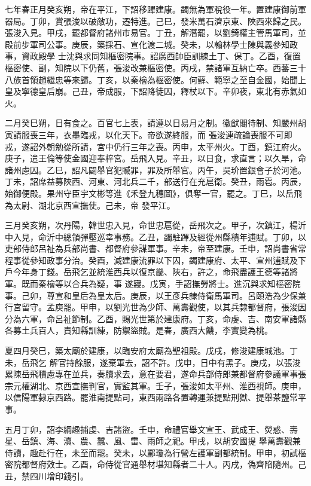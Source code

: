 \begin{pinyinscope}
 七年春正月癸亥朔，帝在平江，下詔移蹕建康。蠲無為軍稅役一年。置建康御前軍器局。丁卯，賞張浚以破敵功，遷特進。己巳，發米萬石濟京東、陜西來歸之民。張浚入見。甲戌，罷都督府諸州市易官。丁丑，解潛罷，以劉錡權主管馬軍司，並殿前步軍司公事。庚辰，築採石、宣化渡二城。癸未，以翰林學士陳與義參知政事，資政殿學
 士沈與求同知樞密院事。詔廣西帥臣訓練土丁、保丁。乙酉，復置樞密使、副，知院以下仍舊，張浚改兼樞密使。丙戌，禁諸軍互納亡卒。西蕃三十八族首領趙繼忠等來歸。丁亥，以秦檜為樞密使。何蘚、範寧之至自金國，始聞上皇及寧德皇后崩。己丑，帝成服，下詔降徒囚，釋杖以下。辛卯夜，東北有赤氣如火。



 二月癸巳朔，日有食之。百官七上表，請遵以日易月之制。徽猷閣待制、知嚴州胡寅請服喪三年，衣墨臨戎，以化天下。帝欲遂終服，而
 張浚連疏論喪服不可即戎，遂詔外朝勉從所請，宮中仍行三年之喪。丙申，太平州火。丁酉，鎮江府火。庚子，遣王倫等使金國迎奉梓宮。岳飛入見。辛丑，以日食，求直言；以久旱，命諸州慮囚。乙巳，詔凡闢舉官犯贓罪，罪及所舉官。丙午，吳玠置銀會子於河池。丁未，詔席益募陜西、河東、河北兵二千，部送行在充扈衛。癸丑，雨雹。丙辰，始御便殿。果州守臣宇文彬等進《禾登九穗圖》，俱奪一官，罷之。丁巳，以岳飛為太尉、湖北京西宣撫使。己未，帝
 發平江。



 三月癸亥朔，次丹陽，韓世忠入見，命世忠扈從，岳飛次之。甲子，次鎮江，楊沂中入見，命沂中總領彈壓巡幸事務。乙丑，蠲駐蹕及經從州縣積年逋賦。丁卯，以吏部侍郎呂祉為兵部尚書、都督府參謀軍事。辛未，帝至建康。壬申，詔尚書省常程事從參知政事分治。癸酉，減建康流罪以下囚，蠲建康府、太平、宣州逋賦及下戶今年身丁錢。岳飛乞並統淮西兵以復京畿、陜右，許之，命飛盡護王德等諸將軍。既而秦檜等以合兵為疑，事
 遂寢。戊寅，手詔撫勞將士。進沉與求知樞密院事。己卯，尊宣和皇后為皇太后。庚辰，以王彥兵隸侍衛馬軍司。呂頤浩為少保兼行宮留守。孟庾罷。甲申，以劉光世為少師、萬壽觀使，以其兵隸都督府，張浚因分為六軍，命呂祉節制。乙酉，賜光世第於建康府。丁亥，命虔、吉、南安軍諸縣各募土兵百人，責知縣訓練，防禦盜賊。是春，廣西大饑，李實變為桃。



 夏四月癸巳，築太廟於建康，以臨安府太廟為聖祖殿。戊戌，修浚建康城池。丁未，岳飛乞
 解官持餘服，遂棄軍去，詔不許。戊申，日中有黑子。庚戌，以張浚累陳岳飛積慮專在並兵，奏牘求去，意在要君，遂命兵部侍郎兼都督府參議軍事張宗元權湖北、京西宣撫判官，實監其軍。壬子，張浚如太平州、淮西視師。庚申，以信陽軍隸京西路。罷淮南提點司，東西兩路各置轉運兼提點刑獄、提舉茶鹽常平事。



 五月丁卯，詔李綱趣捕虔、吉諸盜。壬申，命禮官舉文宣王、武成王、熒惑、壽星、岳鎮、海、瀆、農、蠶、風、雷、雨師之祀。甲戌，以胡安國提
 舉萬壽觀兼侍讀，趣赴行在，未至而罷。癸未，以酈瓊為行營左護軍副都統制。甲申，初試樞密院都督府效士。乙酉，命侍從官通舉材堪知縣者二十人。丙戌，偽齊陷隨州。己丑，禁四川增印錢引。




\end{pinyinscope}
